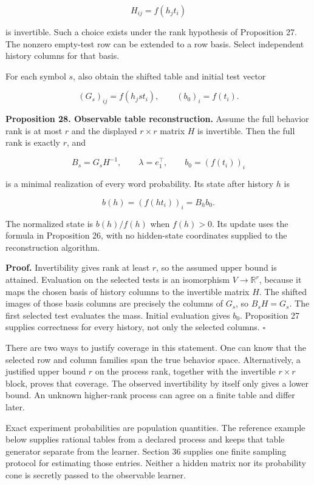 \[
H_{ij}=f(h_jt_i)
\]

is invertible. Such a choice exists under the rank hypothesis of
Proposition 27. The nonzero empty-test row can be extended to a row
basis. Select independent history columns for that basis.

For each symbol \(s\), also obtain the shifted table and initial test
vector

\[
(G_s)_{ij}=f(h_jst_i),\qquad (b_0)_i=f(t_i).
\]

\textbf{Proposition 28. Observable table reconstruction.} Assume the
full behavior rank is at most \(r\) and the displayed \(r\times r\)
matrix \(H\) is invertible. Then the full rank is exactly \(r\), and

\[
\boxed{B_s=G_sH^{-1},\qquad \lambda=e_1^\top,\qquad b_0=(f(t_i))_i}
\]

is a minimal realization of every word probability. Its state after
history \(h\) is

\[
b(h)=(f(ht_i))_i=B_hb_0.
\]

The normalized state is \(b(h)/f(h)\) when \(f(h)>0\). Its update uses
the formula in Proposition 26, with no hidden-state coordinates supplied
to the reconstruction algorithm.

\textbf{Proof.} Invertibility gives rank at least \(r\), so the assumed
upper bound is attained. Evaluation on the selected tests is an
isomorphism \(V\to\mathbb R^r\), because it maps the chosen basis of
history columns to the invertible matrix \(H\). The shifted images of
those basis columns are precisely the columns of \(G_s\), so
\(B_sH=G_s\). The first selected test evaluates the mass. Initial
evaluation gives \(b_0\). Proposition 27 supplies correctness for every
history, not only the selected columns. \(\square\)

There are two ways to justify coverage in this statement. One can know
that the selected row and column families span the true behavior space.
Alternatively, a justified upper bound \(r\) on the process rank,
together with the invertible \(r\times r\) block, proves that coverage.
The observed invertibility by itself only gives a lower bound. An
unknown higher-rank process can agree on a finite table and differ
later.

Exact experiment probabilities are population quantities. The reference
example below supplies rational tables from a declared process and keeps
that table generator separate from the learner. Section 36 supplies one
finite sampling protocol for estimating those entries. Neither a hidden
matrix nor its probability cone is secretly passed to the observable
learner.


